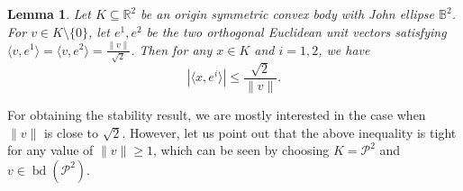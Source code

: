 \documentclass[12pt,a4paper]{article}
\newtheorem{lem}[twr]{Lemma}
\theoremstyle{definition}
\DeclareMathOperator{\bd}{bd}
\newcommand\R{\mathbb{R}}
\newcommand\B{\mathbb{B}}
\newcommand\CP{\mathcal{P}}
\begin{document}
\begin{lem}
\label{lem:orth}
Let $K \subseteq \R^2$ be an origin symmetric convex body with John ellipse $\B^2$. For $v \in K \setminus \{ 0 \}$, let $e^1, e^2$ be the two orthogonal Euclidean unit vectors satisfying $\langle v, e^1 \rangle = \langle v, e^2 \rangle = \frac{\|v\|}{\sqrt{2}}$. Then for any $x \in K$ and $i = 1,2$, we have
$$|\langle x, e^i \rangle | \leq \frac{\sqrt{2}}{\|v\|}.$$
\end{lem}



For obtaining the stability result, we are mostly interested in the case when $\|v\|$ is close to $\sqrt{2}$. However, let us point out that the above inequality is tight for any value of $\| v \| \geq 1$, which can be seen by choosing $K = \CP^2$ and $v \in \bd(\CP^2)$.
\end{document}

